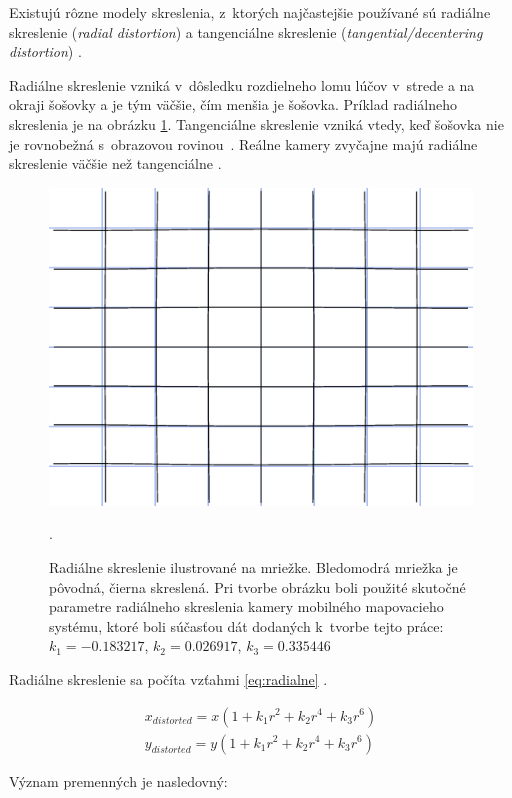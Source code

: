 Existujú rôzne modely skreslenia, z~ktorých najčastejšie používané sú radiálne skreslenie (\emph{radial distortion}) a tangenciálne skreslenie (\emph{tangential/decentering distortion}) \cite{sun_cooperstock_camera_calibration}.

Radiálne skreslenie vzniká v~dôsledku rozdielneho lomu lúčov v~strede a na okraji šošovky a je tým väčšie, čím menšia je šošovka. Príklad radiálneho skreslenia je na obrázku \ref{fig:radialne_skreslenie}. Tangenciálne skreslenie vzniká vtedy, keď šošovka nie je rovnobežná s~obrazovou rovinou~\cite{matlab_camera_calibration}. Reálne kamery zvyčajne majú radiálne skreslenie väčšie než tangenciálne \cite{opencv_camera_calibration_older}.

\begin{figure}[t]
    \centering
    \includegraphics[width=0.6\linewidth]{text_prace/obrazky-figures/radialne_skreslenie.png}
    \caption[Radiálne skreslenie kamery ilustrované na mriežke.]{Radiálne skreslenie ilustrované na mriežke. Bledomodrá mriežka je pôvodná, čierna skreslená. Pri tvorbe obrázku boli použité skutočné parametre radiálneho skreslenia kamery mobilného mapovacieho systému, ktoré boli súčasťou dát dodaných k~tvorbe tejto práce: $k_1 = -0.183217$, $k_2 = 0.026917$, $k_3 = 0.335446$}.
    \label{fig:radialne_skreslenie}
\end{figure}

Radiálne skreslenie sa počíta vzťahmi \ref{eq:radialne} \cite{opencv_camera_calibration}.

\begin{equation}
\begin{aligned}
x_{distorted} = x(1 + k_1 r^2 + k_2 r^4 + k_3 r^6) \\
y_{distorted} = y(1 + k_1 r^2 + k_2 r^4 + k_3 r^6)
\label{eq:radialne}
\end{aligned}
\end{equation}

Význam premenných je nasledovný:

